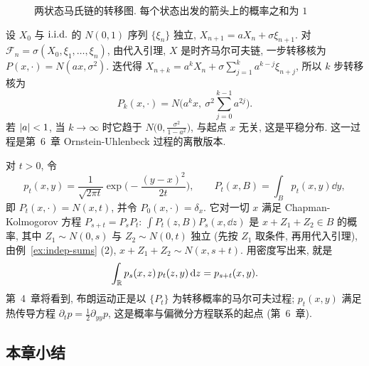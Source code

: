 \begin{figure}[htbp]
\centering
{}
\caption{两状态马氏链的转移图. 每个状态出发的箭头上的概率之和为 $1$}
\label{fig:two-state}
\end{figure}

\begin{example}[正态自回归过程]\label{ex:ar1}
设 $X_0$ 与 $\text{i.i.d.}$ 的 $N(0,1)$ 序列 $\{\xi_n\}$ 独立, $X_{n+1}=aX_n+\sigma\xi_{n+1}$. 对 $\mathcal{F}_n=\sigma(X_0,\xi_1,\dots,\xi_n)$, 由代入引理, $X$ 是时齐马尔可夫链, 一步转移核为 $P(x,\cdot)=N(ax,\sigma^2)$. 迭代得 $X_{n+k}=a^kX_n+\sigma\sum_{j=1}^ka^{k-j}\xi_{n+j}$, 所以 $k$ 步转移核为
\[
P_k(x,\cdot)=N\Big(a^kx,\ \sigma^2\sum_{j=0}^{k-1}a^{2j}\Big).
\]
若 $\lvert a\rvert<1$, 当 $k\to\infty$ 时它趋于 $N\big(0,\frac{\sigma^2}{1-a^2}\big)$, 与起点 $x$ 无关, 这是平稳分布. 这一过程是第~6~章 Ornstein-Uhlenbeck 过程的离散版本.
\end{example}

\begin{example}[热核]\label{ex:heat-kernel}
对 $t>0$, 令
\[
p_t(x,y)=\frac{1}{\sqrt{2\pi t}}\exp\Big(-\frac{(y-x)^2}{2t}\Big),\qquad P_t(x,B)=\int_Bp_t(x,y)\dd y,
\]
即 $P_t(x,\cdot)=N(x,t)$, 并令 $P_0(x,\cdot)=\delta_x$. 它对一切 $x$ 满足 Chapman-Kolmogorov 方程 $P_{s+t}=P_sP_t$: $\int P_t(z,B)P_s(x,\dd z)$ 是 $x+Z_1+Z_2\in B$ 的概率, 其中 $Z_1\sim N(0,s)$ 与 $Z_2\sim N(0,t)$ 独立 (先按 $Z_1$ 取条件, 再用代入引理), 由例~\ref{ex:indep-sums} (2), $x+Z_1+Z_2\sim N(x,s+t)$. 用密度写出来, 就是
\[
\int_{\mathbb{R}}p_s(x,z)\,p_t(z,y)\mathop{}\!\mathrm{d} z=p_{s+t}(x,y).
\]
第~4~章将看到, 布朗运动正是以 $\{P_t\}$ 为转移概率的马尔可夫过程; $p_t(x,y)$ 满足热传导方程 $\partial_tp=\frac{1}{2}\partial_{yy}p$, 这是概率与偏微分方程联系的起点 (第~6~章).
\end{example}

\subsection*{本章小结}

